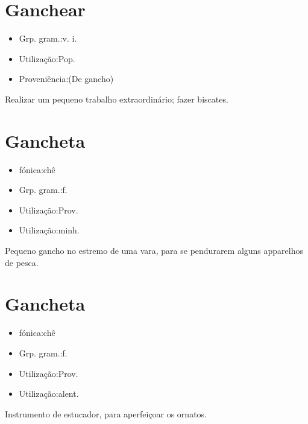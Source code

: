 \section{Ganchear}
\begin{itemize}
\item {Grp. gram.:v. i.}
\end{itemize}
\begin{itemize}
\item {Utilização:Pop.}
\end{itemize}
\begin{itemize}
\item {Proveniência:(De \textunderscore gancho\textunderscore )}
\end{itemize}
Realizar um pequeno trabalho extraordinário; fazer biscates.
\section{Gancheta}
\begin{itemize}
\item {fónica:chê}
\end{itemize}
\begin{itemize}
\item {Grp. gram.:f.}
\end{itemize}
\begin{itemize}
\item {Utilização:Prov.}
\end{itemize}
\begin{itemize}
\item {Utilização:minh.}
\end{itemize}
Pequeno gancho no estremo de uma vara, para se pendurarem alguns apparelhos de pesca.
\section{Gancheta}
\begin{itemize}
\item {fónica:chê}
\end{itemize}
\begin{itemize}
\item {Grp. gram.:f.}
\end{itemize}
\begin{itemize}
\item {Utilização:Prov.}
\end{itemize}
\begin{itemize}
\item {Utilização:alent.}
\end{itemize}
Instrumento de estucador, para aperfeiçoar os ornatos.
